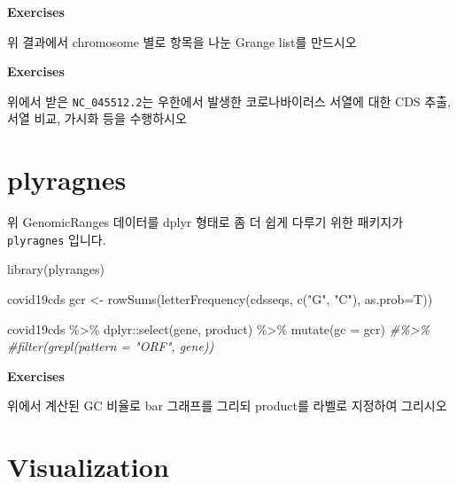 \documentclass[
]{book}
\newenvironment{Shaded}{\begin{snugshade}}{\end{snugshade}}
\newcommand{\AttributeTok}[1]{\textcolor[rgb]{0.77,0.63,0.00}{#1}}
\newcommand{\CommentTok}[1]{\textcolor[rgb]{0.56,0.35,0.01}{\textit{#1}}}
\newcommand{\FunctionTok}[1]{\textcolor[rgb]{0.00,0.00,0.00}{#1}}
\newcommand{\NormalTok}[1]{#1}
\newcommand{\OtherTok}[1]{\textcolor[rgb]{0.56,0.35,0.01}{#1}}
\newcommand{\SpecialCharTok}[1]{\textcolor[rgb]{0.00,0.00,0.00}{#1}}
\newcommand{\StringTok}[1]{\textcolor[rgb]{0.31,0.60,0.02}{#1}}
\begin{document}
\textbf{Exercises }

위 결과에서 chromosome 별로 항목을 나눈 Grange list를 만드시오

\textbf{Exercises }

위에서 받은 \texttt{NC\_045512.2}는 우한에서 발생한 코로나바이러스 서열에 대한 CDS 추출, 서열 비교, 가시화 등을 수행하시오

\hypertarget{plyragnes}{%
\section{plyragnes}\label{plyragnes}}

위 GenomicRanges 데이터를 dplyr 형태로 좀 더 쉽게 다루기 위한 패키지가 \texttt{plyragnes} 입니다.

\begin{Shaded}
\begin{Highlighting}[]
\FunctionTok{library}\NormalTok{(plyranges)}

\NormalTok{covid19cds}
\NormalTok{gcr }\OtherTok{\textless{}{-}} \FunctionTok{rowSums}\NormalTok{(}\FunctionTok{letterFrequency}\NormalTok{(cdsseqs, }\FunctionTok{c}\NormalTok{(}\StringTok{"G"}\NormalTok{, }\StringTok{"C"}\NormalTok{), }\AttributeTok{as.prob=}\NormalTok{T))}

\NormalTok{covid19cds }\SpecialCharTok{\%\textgreater{}\%} 
\NormalTok{  dplyr}\SpecialCharTok{::}\FunctionTok{select}\NormalTok{(gene, product) }\SpecialCharTok{\%\textgreater{}\%} 
  \FunctionTok{mutate}\NormalTok{(}\AttributeTok{gc =}\NormalTok{ gcr) }\CommentTok{\#\%\textgreater{}\%}
  \CommentTok{\#filter(grepl(pattern = "ORF", gene)) }
\end{Highlighting}
\end{Shaded}

\textbf{Exercises }

위에서 계산된 GC 비율로 bar 그래프를 그리되 product를 라벨로 지정하여 그리시오

\hypertarget{visualization}{%
\section{Visualization}\label{visualization}}
\end{document}
